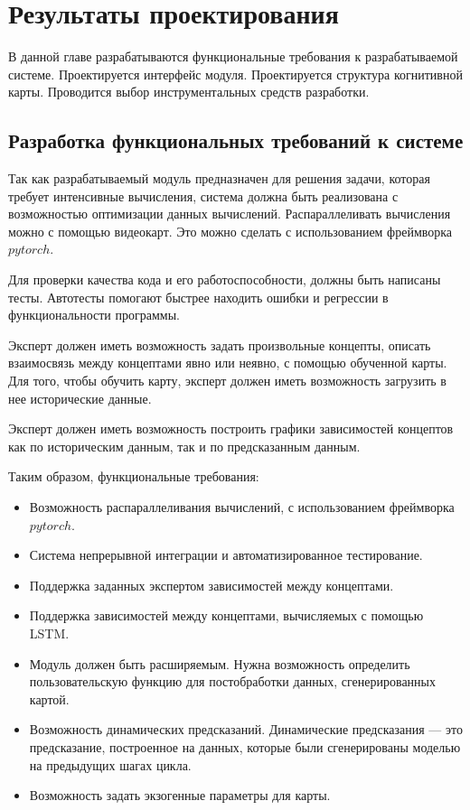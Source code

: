 \chapter{Результаты проектирования}

В данной главе разрабатываются функциональные требования к разрабатываемой системе.
Проектируется интерфейс модуля. Проектируется структура когнитивной карты.
Проводится выбор инструментальных средств разработки.

\section{Разработка функциональных требований к системе}

Так как разрабатываемый модуль предназначен для решения задачи, которая
требует интенсивные вычисления, система должна быть реализована
с возможностью оптимизации данных вычислений. Распараллеливать вычисления
можно с помощью видеокарт. Это можно сделать с использованием фреймворка $ pytorch $.

Для проверки качества кода и его работоспособности, должны быть написаны тесты.
Автотесты помогают быстрее находить ошибки и регрессии в функциональности программы.

Эксперт должен иметь возможность задать произвольные концепты, описать
взаимосвязь между концептами явно или неявно, с помощью обученной карты.
Для того, чтобы обучить карту, эксперт должен иметь возможность загрузить
в нее исторические данные.

Эксперт должен иметь возможность построить графики зависимостей концептов
как по историческим данным, так и по предсказанным данным.

Таким образом, функциональные требования:
\begin{itemize}
	\item Возможность распараллеливания вычислений, с использованием фреймворка $pytorch$.
	\item Система непрерывной интеграции и автоматизированное тестирование.
	\item Поддержка заданных экспертом зависимостей между концептами.
	\item Поддержка зависимостей между концептами, вычисляемых с помощью LSTM.
	\item Модуль должен быть расширяемым. Нужна возможность определить пользовательскую функцию для постобработки данных, сгенерированных картой.
	\item Возможность динамических предсказаний. Динамические предсказания --- это
	предсказание, построенное на данных, которые были сгенерированы моделью на предыдущих шагах цикла.
	\item Возможность задать экзогенные параметры для карты.
\end{itemize}

